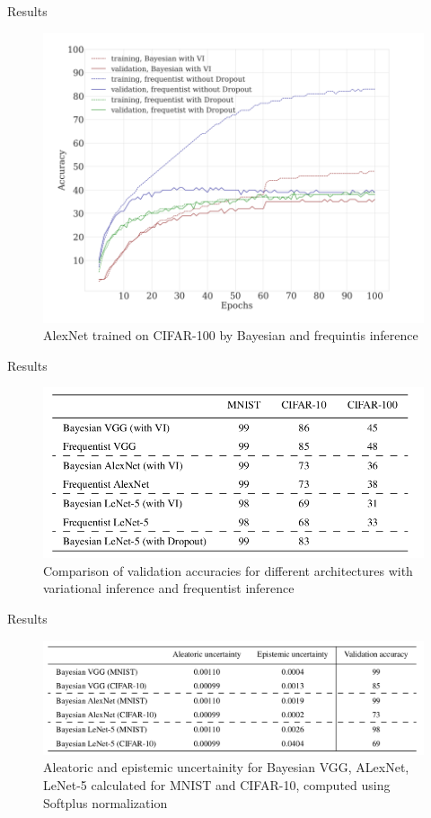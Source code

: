 \documentclass{beamer}
\theoremstyle{remark}
\begin{document}
\begin{frame}{Results}
    \begin{figure}
        \centering
        \includegraphics[scale=0.3]{Project_img2.png}
        \caption{AlexNet trained on CIFAR-100 by Bayesian and frequintis inference}
        \label{fig2}
    \end{figure}
\end{frame}
\begin{frame}{Results}
    \begin{figure}
        \centering
        \includegraphics[scale=0.3]{Project_img3.png}
        \caption{Comparison of validation accuracies for different architectures with variational inference and frequentist inference}
        \label{fig3}
    \end{figure}
\end{frame}
\begin{frame}{Results}
    \begin{figure}
        \centering
        \includegraphics[scale=0.3]{Project_img4.png}
        \caption{Aleatoric and epistemic uncertainity for Bayesian VGG, ALexNet, LeNet-5 calculated for MNIST and CIFAR-10, computed using Softplus normalization}
        \label{fig4}
    \end{figure}
\end{frame}
\end{document}
